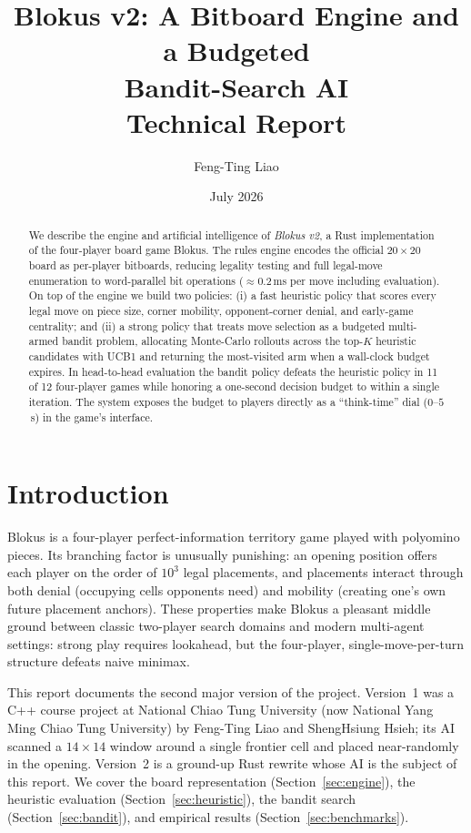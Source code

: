 \documentclass[11pt]{article}
\title{\textbf{Blokus v2: A Bitboard Engine and a Budgeted\\ Bandit-Search AI}\\[6pt]
\large Technical Report}
\author{Feng-Ting Liao}
\date{July 2026}
\begin{document}
\maketitle

\begin{abstract}
We describe the engine and artificial intelligence of \emph{Blokus v2}, a Rust
implementation of the four-player board game Blokus. The rules engine encodes
the official $20\times 20$ board as per-player bitboards, reducing legality
testing and full legal-move enumeration to word-parallel bit operations
($\approx$0.2\,ms per move including evaluation). On top of the engine we
build two policies: (i) a fast heuristic policy that scores every legal move
on piece size, corner mobility, opponent-corner denial, and early-game
centrality; and (ii) a strong policy that treats move selection as a budgeted
multi-armed bandit problem, allocating Monte-Carlo rollouts across the top-$K$
heuristic candidates with UCB1 and returning the most-visited arm when a
wall-clock budget expires. In head-to-head evaluation the bandit policy
defeats the heuristic policy in 11 of 12 four-player games while honoring a
one-second decision budget to within a single iteration. The system exposes
the budget to players directly as a ``think-time'' dial ($0$--$5$\,s) in the
game's interface.
\end{abstract}

\section{Introduction}

Blokus is a four-player perfect-information territory game played with
polyomino pieces. Its branching factor is unusually punishing: an opening
position offers each player on the order of $10^3$ legal placements, and
placements interact through both denial (occupying cells opponents need) and
mobility (creating one's own future placement anchors). These properties make
Blokus a pleasant middle ground between classic two-player search domains and
modern multi-agent settings: strong play requires lookahead, but the
four-player, single-move-per-turn structure defeats naive minimax.

This report documents the second major version of the project. Version~1 was
a C++ course project at National Chiao Tung University (now National Yang
Ming Chiao Tung University) by Feng-Ting Liao and ShengHsiung Hsieh; its AI
scanned a $14\times 14$ window around a single frontier cell and placed
near-randomly in the opening. Version~2 is a ground-up Rust rewrite whose AI
is the subject of this report. We cover the board representation
(Section~\ref{sec:engine}), the heuristic evaluation
(Section~\ref{sec:heuristic}), the bandit search
(Section~\ref{sec:bandit}), and empirical results
(Section~\ref{sec:benchmarks}).
\end{document}

